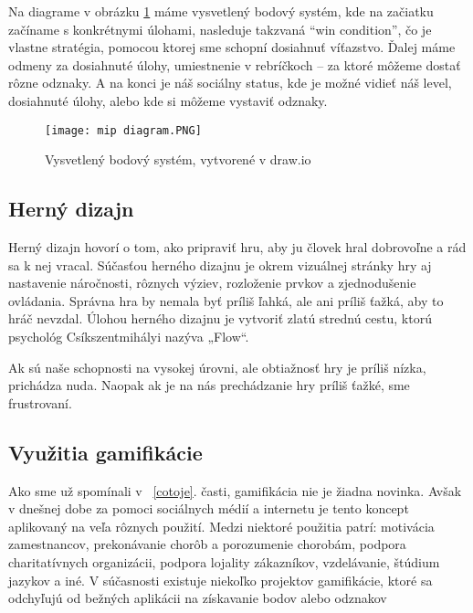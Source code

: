 \documentclass{article}
\begin{document}
Na diagrame v obrázku \ref{fig:diagraml} máme vysvetlený bodový systém, kde na začiatku začíname s konkrétnymi úlohami, nasleduje takzvaná “win condition”, čo je vlastne stratégia, pomocou ktorej sme schopní dosiahnuť víťazstvo. Ďalej máme odmeny za dosiahnuté úlohy, umiestnenie v  rebríčkoch – za ktoré môžeme dostať rôzne odznaky. A na konci je náš sociálny status, kde je možné vidieť náš level, dosiahnuté úlohy, alebo kde si môžeme vystaviť odznaky.

\begin{figure}
     \texttt{[image: mip diagram.PNG]} 
     \caption{Vysvetlený bodový systém, vytvorené v draw.io} 
     \label{fig:diagraml} 
\end{figure}

\subsection{Herný dizajn}\label{dizajn}

Herný dizajn hovorí o tom, ako pripraviť hru, aby ju človek hral dobrovoľne a rád sa k nej vracal. Súčasťou herného dizajnu je okrem vizuálnej stránky hry aj nastavenie náročnosti, rôznych výziev, rozloženie prvkov a zjednodušenie ovládania. Správna hra by nemala byť príliš ľahká, ale ani príliš ťažká, aby to hráč nevzdal. Úlohou herného dizajnu je vytvoriť zlatú strednú cestu, ktorú psychológ Csíkszentmihályi nazýva „Flow“\cite{flow}. 

Ak sú naše schopnosti na vysokej úrovni, ale obtiažnosť hry je príliš nízka, prichádza nuda. Naopak ak je na nás prechádzanie hry príliš ťažké, sme frustrovaní.

\subsection{Využitia gamifikácie}\label{vyuzitie}

Ako sme už spomínali v ~\ref{cotoje}. časti, gamifikácia nie je žiadna novinka. Avšak v dnešnej dobe za pomoci sociálnych médií a internetu je tento koncept aplikovaný na veľa rôznych použití. Medzi niektoré použitia patrí: motivácia zamestnancov, prekonávanie chorôb a porozumenie chorobám, podpora charitatívnych organizácii, podpora lojality zákazníkov, vzdelávanie, štúdium jazykov a iné.
V súčasnosti existuje niekoľko projektov gamifikácie, ktoré sa odchyľujú od bežných aplikácii na získavanie bodov alebo odznakov
\end{document}
